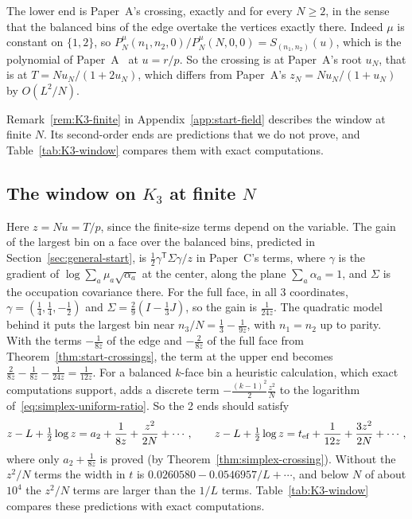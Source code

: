 \begin{example}
The lower end is Paper~A's crossing, exactly and for every $N\ge2$, in the
sense that the balanced bins of the edge overtake the vertices exactly there.
Indeed $\mu$ is constant on $\{1,2\}$, so
$P^\mu_N(n_1,n_2,0)/P^\mu_N(N,0,0)=S_{(n_1,n_2)}(u)$, which is the polynomial of
Paper~A~\cite{paperA} at $u=r/p$. So the crossing is at Paper~A's root $u_N$,
that is at $T=Nu_N/(1+2u_N)$, which differs from Paper~A's $z_N=Nu_N/(1+u_N)$ by
$O(L^2/N)$.
\end{example}

Remark~\ref{rem:K3-finite} in Appendix~\ref{app:start-field} describes the
window at finite $N$. Its second-order ends are predictions that we do not
prove, and Table~\ref{tab:K3-window} compares them with exact computations.


\subsection{\texorpdfstring{The window on $K_3$ at finite $N$}{The window on K3 at finite N}}

\begin{remark}\label{rem:K3-finite}
Here $z=Nu=T/p$, since the finite-size terms depend on the variable. The gain
of the largest bin on a face over the balanced bins, predicted in Section~\ref{sec:general-start}, is
$\frac12\gamma^{\mathsf T}\Sigma\gamma/z$ in Paper~C's terms, where $\gamma$ is
the gradient of $\log\sum_a\mu_a\sqrt{\alpha_a}$ at the center, along the plane
$\sum_a\alpha_a=1$, and $\Sigma$ is the occupation covariance there. For the full face, in all 3 coordinates,
$\gamma=(\frac14,\frac14,-\frac12)$ and $\Sigma=\frac29(I-\frac13J)$, so the gain
is $\frac1{24z}$. The quadratic model behind it puts the largest bin near
$n_3/N=\frac13-\frac1{9z}$, with $n_1=n_2$ up to parity. With the terms
$-\frac1{8z}$ of the edge and $-\frac2{8z}$ of the full face from
Theorem~\ref{thm:start-crossings}, the term at the upper end becomes
$\frac2{8z}-\frac1{8z}-\frac1{24z}=\frac1{12z}$. For a balanced $k$-face bin a
heuristic calculation, which exact computations support, adds a discrete term
$-\frac{(k-1)^2}2\frac{z^2}N$ to the logarithm
of~\eqref{eq:simplex-uniform-ratio}. So the 2 ends should satisfy
\[
 z-L+\tfrac12\log z=a_2+\frac1{8z}+\frac{z^2}{2N}+\cdots,\qquad
 z-L+\tfrac12\log z=t_{\rm ef}+\frac1{12z}+\frac{3z^2}{2N}+\cdots,
\]
where only $a_2+\frac1{8z}$ is proved (by Theorem~\ref{thm:simplex-crossing}).
Without the $z^2/N$ terms the width in $t$ is $0.0260580-0.0546957/L+\cdots$,
and below $N$ of about $10^4$ the $z^2/N$ terms are larger than the $1/L$ terms.
Table~\ref{tab:K3-window} compares these predictions with exact computations.
\end{remark}

